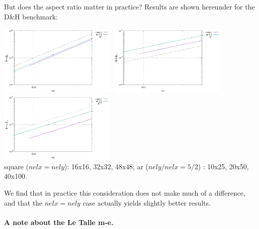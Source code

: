 But does the aspect ratio matter in practice? 
Results are shown hereunder for the D\&H benchmark:

\begin{center}
\includegraphics[width=5.7cm]{python_codes/fieldstone_78/results/exp01/stenberg_study/errors_u.pdf}
\includegraphics[width=5.7cm]{python_codes/fieldstone_78/results/exp01/stenberg_study/errors_p.pdf}
\includegraphics[width=5.7cm]{python_codes/fieldstone_78/results/exp01/stenberg_study/errors_q1.pdf}\\
{\captionfont square ($nelx=nely$): 16x16, 32x32, 48x48; 
ar ($nely/nelx=5/2$) : 10x25, 20x50, 40x100.}
\end{center}

We find that in practice this consideration does not make much of a difference,
and that the $nelx=nely$ case actually yields slightly better results.

\paragraph{A note about the Le Talle m-e.}

\begin{center}
\end{center}

